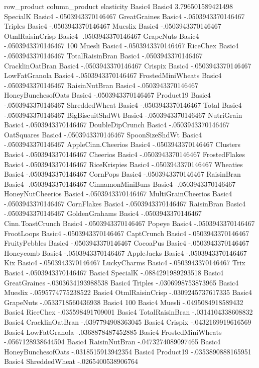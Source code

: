 row_product	column_product	elasticity
Basic4	Basic4	3.796501589421498
SpecialK	Basic4	-.0503943370146467
GreatGraines	Basic4	-.0503943370146467
Triples	Basic4	-.0503943370146467
Mueslix	Basic4	-.0503943370146467
OtmlRaisinCrisp	Basic4	-.0503943370146467
GrapeNuts	Basic4	-.0503943370146467
100%
Muesli	Basic4	-.0503943370146467
RiceChex	Basic4	-.0503943370146467
TotalRaisinBran	Basic4	-.0503943370146467
CracklinOatBran	Basic4	-.0503943370146467
Crispix	Basic4	-.0503943370146467
LowFatGranola	Basic4	-.0503943370146467
FrostedMiniWheats	Basic4	-.0503943370146467
RaisinNutBran	Basic4	-.0503943370146467
HoneyBunchesofOats	Basic4	-.0503943370146467
Product19	Basic4	-.0503943370146467
ShreddedWheat	Basic4	-.0503943370146467
Total	Basic4	-.0503943370146467
BigBiscuitShdWt	Basic4	-.0503943370146467
NutriGrain	Basic4	-.0503943370146467
DoubleDipCrunch	Basic4	-.0503943370146467
OatSquares	Basic4	-.0503943370146467
SpoonSizeShdWt	Basic4	-.0503943370146467
AppleCinn.Cheerios	Basic4	-.0503943370146467
Clusters	Basic4	-.0503943370146467
Cheerios	Basic4	-.0503943370146467
FrostedFlakes	Basic4	-.0503943370146467
RiceKrispies	Basic4	-.0503943370146467
Wheaties	Basic4	-.0503943370146467
CornPops	Basic4	-.0503943370146467
RaisinBran	Basic4	-.0503943370146467
CinnamonMiniBuns	Basic4	-.0503943370146467
HoneyNutCheerios	Basic4	-.0503943370146467
MultiGrainCheerios	Basic4	-.0503943370146467
CornFlakes	Basic4	-.0503943370146467
RaisinBran	Basic4	-.0503943370146467
GoldenGrahams	Basic4	-.0503943370146467
Cinn.ToastCrunch	Basic4	-.0503943370146467
Popeye	Basic4	-.0503943370146467
FrootLoops	Basic4	-.0503943370146467
CaptCrunch	Basic4	-.0503943370146467
FruityPebbles	Basic4	-.0503943370146467
CocoaPus	Basic4	-.0503943370146467
Honeycomb	Basic4	-.0503943370146467
AppleJacks	Basic4	-.0503943370146467
Kix	Basic4	-.0503943370146467
LuckyCharms	Basic4	-.0503943370146467
Trix	Basic4	-.0503943370146467
Basic4	SpecialK	-.0884291989293518
Basic4	GreatGraines	-.0303634193988538
Basic4	Triples	-.0306998753873965
Basic4	Mueslix	-.0595774775238522
Basic4	OtmlRaisinCrisp	-.0309245737617335
Basic4	GrapeNuts	-.0533718560436938
Basic4	100%
Basic4	Muesli	-.0495084918589432
Basic4	RiceChex	-.035598491709001
Basic4	TotalRaisinBran	-.0314104338608832
Basic4	CracklinOatBran	-.0397794908363045
Basic4	Crispix	-.0432169919616569
Basic4	LowFatGranola	-.0368878487452885
Basic4	FrostedMiniWheats	-.0567128938644504
Basic4	RaisinNutBran	-.0473274089097465
Basic4	HoneyBunchesofOats	-.0318515913942354
Basic4	Product19	-.0353890888165951
Basic4	ShreddedWheat	-.0265400538906764
